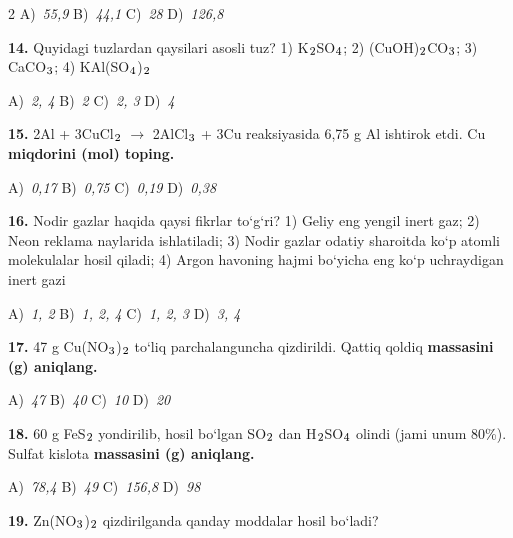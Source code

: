 \documentclass[11pt,a4paper]{article}
\renewcommand{\textsubscript}[1]{\ensuremath{_{\text{\fontsize{8}{8}\selectfont #1}}}}
\begin{document}
\begin{multicols}{2}
\noindent A)~\textsl{55,9} \hfill B)~\textsl{44,1} \hfill C)~\textsl{28} \hfill D)~\textsl{126,8}\par
\vspace{4pt}
\noindent\textbf{14.} Quyidagi tuzlardan qaysilari asosli tuz? 1) K\textsubscript{2}SO\textsubscript{4}; 2) (CuOH)\textsubscript{2}CO\textsubscript{3}; 3) CaCO\textsubscript{3}; 4) KAl(SO\textsubscript{4})\textsubscript{2}

\noindent A)~\textsl{2, 4} \hfill B)~\textsl{2} \hfill C)~\textsl{2, 3} \hfill D)~\textsl{4}\par
\vspace{4pt}
\noindent\textbf{15.} 2Al + 3CuCl\textsubscript{2} $\to$ 2AlCl\textsubscript{3} + 3Cu reaksiyasida 6,75 g Al ishtirok etdi. Cu \textbf{miqdorini (mol) toping.}

\noindent A)~\textsl{0,17} \hfill B)~\textsl{0,75} \hfill C)~\textsl{0,19} \hfill D)~\textsl{0,38}\par
\vspace{4pt}
\noindent\textbf{16.} Nodir gazlar haqida qaysi fikrlar to`g`ri? 1) Geliy eng yengil inert gaz; 2) Neon reklama naylarida ishlatiladi; 3) Nodir gazlar odatiy sharoitda ko`p atomli molekulalar hosil qiladi; 4) Argon havoning hajmi bo`yicha eng ko`p uchraydigan inert gazi

\noindent A)~\textsl{1, 2} \hfill B)~\textsl{1, 2, 4} \hfill C)~\textsl{1, 2, 3} \hfill D)~\textsl{3, 4}\par
\vspace{4pt}
\noindent\textbf{17.} 47 g Cu(NO\textsubscript{3})\textsubscript{2} to`liq parchalanguncha qizdirildi. Qattiq qoldiq \textbf{massasini (g) aniqlang.}

\noindent A)~\textsl{47} \hfill B)~\textsl{40} \hfill C)~\textsl{10} \hfill D)~\textsl{20}\par
\vspace{4pt}
\noindent\textbf{18.} 60 g FeS\textsubscript{2} yondirilib, hosil bo`lgan SO\textsubscript{2} dan H\textsubscript{2}SO\textsubscript{4} olindi (jami unum 80\%). Sulfat kislota \textbf{massasini (g) aniqlang.}

\noindent A)~\textsl{78,4} \hfill B)~\textsl{49} \hfill C)~\textsl{156,8} \hfill D)~\textsl{98}\par
\vspace{4pt}
\noindent\textbf{19.} Zn(NO\textsubscript{3})\textsubscript{2} qizdirilganda qanday moddalar hosil bo`ladi?


\end{multicols}
\end{document}

